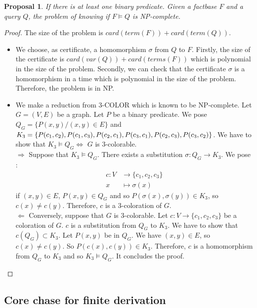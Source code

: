 \documentclass{article}
\newtheorem{proposal}{Proposal}[section]
\theoremstyle{definition}
\theoremstyle{remark}
\begin{document}
\begin{proposal} If there is at least one binary predicate. Given a factbase $F$ and a query $Q$, the problem of knowing if $F \models Q$ is NP-complete. 
\end{proposal}

\begin{proof} The size of the problem is $card(term(F))+card(term(Q))$.
\begin{itemize}
\item We choose, as certificate, a homomorphism $\sigma$ from $Q$ to $F$. Firstly, the size of the certificate is $card(var(Q))+ card(terms(F))$ which is polynomial in the size of the problem. Secondly, we can check that the certificate $\sigma$ is a homomorphism in a time which is polynomial in the size of the problem. Therefore, the problem is in NP.  
\item We make a reduction from 3-COLOR which is known to be NP-complete. Let $G= (V,E)$ be a graph. Let $P$ be a binary predicate. We pose $Q_G = \{P(x,y)/(x,y) \in E\}$ and $K_3 = \{P(c_1,c_2),P(c_1,c_3), P(c_2,c_1),P(c_3,c_1),\\P(c_2,c_3),P(c_3,c_2)\}$. We have to show that $K_3 \models Q_G \Leftrightarrow$ $G$ is 3-colorable. \\
$\boxed{\Rightarrow}$ Suppose that $K_3 \models Q_G$. There exists a substitution $\sigma:Q_G \to K_3$. We pose : 
\begin{align*}
c:V &\to \{c_1,c_2,c_3\}\\
x &\mapsto \sigma(x)
\end{align*}
if $(x,y) \in E$, $P(x,y) \in Q_G$ and so $P(\sigma(x),\sigma(y)) \in K_3$, so $c(x) \neq c(y)$. Therefore, $c$ is a 3-coloration of $G$. \\
$\boxed{\Leftarrow}$ Conversely, suppose that $G$ is 3-colorable. Let $c:V \to \{c_1,c_2,c_3\}$ be a coloration of $G$. $c$ is a substitution from $Q_G$ to $K_3$. We have to show that $c(Q_G) \subset K_3$. Let $P(x,y)$ be in $Q_G$. We have $(x,y) \in E$, so $c(x) \neq c(y)$. So $P(c(x),c(y)) \in K_3$. Therefore, $c$ is a homomorphism from $Q_G$ to $K_3$ and so $K_3 \models Q_G$. It concludes the proof.
\end{itemize}
\end{proof}

\subsection{Core chase for finite derivation}
\end{document}
